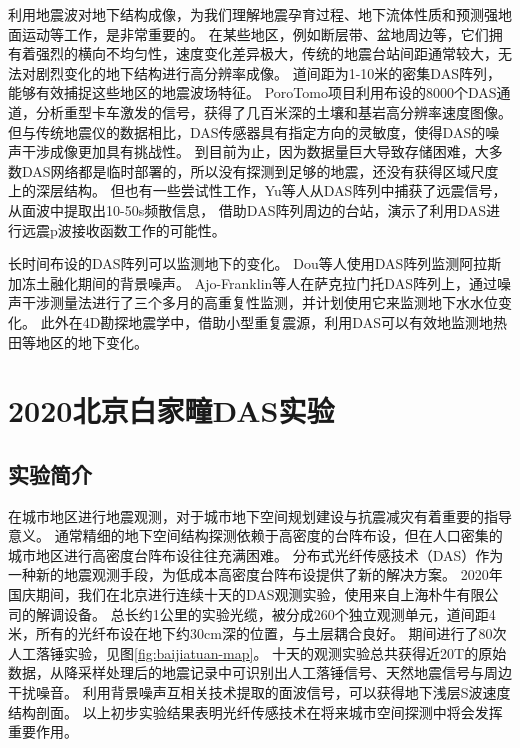 利用地震波对地下结构成像，为我们理解地震孕育过程、地下流体性质和预测强地面运动等工作，是非常重要的。
在某些地区，例如断层带、盆地周边等，它们拥有着强烈的横向不均匀性，速度变化差异极大，传统的地震台站间距通常较大，无法对剧烈变化的地下结构进行高分辨率成像。
道间距为1-10米的密集DAS阵列，能够有效捕捉这些地区的地震波场特征。
PoroTomo项目利用布设的8000个DAS通道，分析重型卡车激发的信号，获得了几百米深的土壤和基岩高分辨率速度图像\citep{parker2018active}。
但与传统地震仪的数据相比，DAS传感器具有指定方向的灵敏度，使得DAS的噪声干涉成像更加具有挑战性\citep{martin2021introduction}。
到目前为止，因为数据量巨大导致存储困难，大多数DAS网络都是临时部署的，所以没有探测到足够的地震，还没有获得区域尺度上的深层结构。
但也有一些尝试性工作，Yu等人\citep{yu2019potential}从DAS阵列中捕获了远震信号，从面波中提取出10-50s频散信息，
借助DAS阵列周边的台站，演示了利用DAS进行远震p波接收函数工作的可能性。


长时间布设的DAS阵列可以监测地下的变化。
Dou等人\citep{dou2016surface}使用DAS阵列监测阿拉斯加冻土融化期间的背景噪声。
Ajo-Franklin等人\citep{ajo2019distributed}在萨克拉门托DAS阵列上，通过噪声干涉测量法进行了三个多月的高重复性监测，并计划使用它来监测地下水水位变化。
此外在4D勘探地震学中，借助小型重复震源，利用DAS可以有效地监测地热田等地区的地下变化。













\section{2020北京白家疃DAS实验}

\subsection{实验简介}
在城市地区进行地震观测，对于城市地下空间规划建设与抗震减灾有着重要的指导意义。
通常精细的地下空间结构探测依赖于高密度的台阵布设，但在人口密集的城市地区进行高密度台阵布设往往充满困难。
分布式光纤传感技术（DAS）作为一种新的地震观测手段，为低成本高密度台阵布设提供了新的解决方案。
2020年国庆期间，我们在北京进行连续十天的DAS观测实验，使用来自上海朴牛有限公司的解调设备。
总长约1公里的实验光缆，被分成260个独立观测单元，道间距4米，所有的光纤布设在地下约30cm深的位置，与土层耦合良好。
期间进行了80次人工落锤实验，见图\ref{fig:baijiatuan-map}。
十天的观测实验总共获得近20T的原始数据，从降采样处理后的地震记录中可识别出人工落锤信号、天然地震信号与周边干扰噪音。
利用背景噪声互相关技术提取的面波信号，可以获得地下浅层S波速度结构剖面。
以上初步实验结果表明光纤传感技术在将来城市空间探测中将会发挥重要作用。

